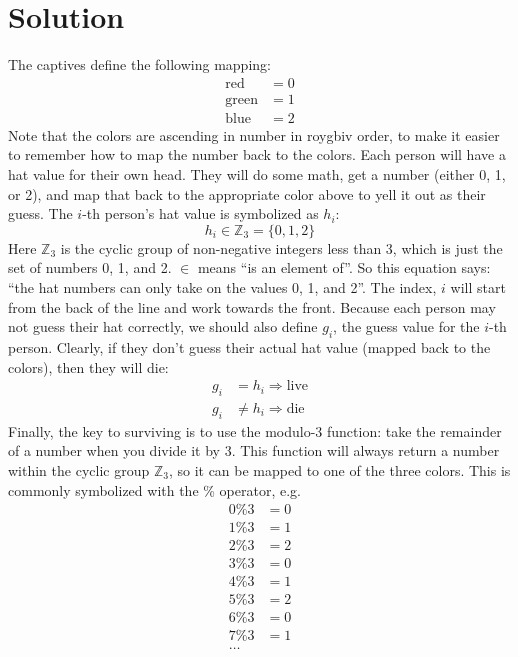 \documentclass[10pt]{article}
\begin{document}
\newpage

\section{Solution}

The captives define the following mapping:
\begin{align*}
    \text{red} &= 0 \\
    \text{green} &= 1 \\
    \text{blue} &= 2
\end{align*}
Note that the colors are ascending in number in roygbiv order, to 
make it easier to remember how to map the number back to the colors. 
Each person will have a hat value for their own head. They will 
do some math, get a number (either 0, 1, or 2), and map that back to 
the appropriate color above to yell it out as their guess. 
The $i$-th person's 
hat value is symbolized as $h_i$:
\begin{equation*}
    h_i \in \mathbb{Z}_3 = \{0,1,2\}
\end{equation*}
Here $\mathbb{Z}_3$ is the cyclic group of non-negative 
integers less than 3, which is just the set of numbers 0, 1, and 2. $\in$ 
means ``is an element of''. So this equation says: ``the hat numbers can only 
take on the values 0, 1, and 2''. The 
index, $i$ will start from the back of the line and work towards the 
front. Because each person may not guess their hat correctly, we should 
also define $g_i$, the guess value for the $i$-th person. Clearly, if they 
don't guess their actual hat value (mapped back to the colors), then they will 
die:
\begin{align*}
    g_i &= h_i \Rightarrow\text{live} \\
    g_i &\neq h_i \Rightarrow\text{die}
\end{align*}
Finally, the key to surviving is to use the modulo-3 function: take the 
remainder of a number when you divide it by 3. This function will always 
return a number within the cyclic group $\mathbb{Z}_3$, so it can be mapped 
to one of the three colors. This is commonly symbolized with the 
\% operator, e.g.
\begin{align*}
    0\%3&=0 \\
    1\%3&=1 \\
    2\%3&=2 \\
    3\%3&=0 \\
    4\%3&=1 \\
    5\%3&=2 \\
    6\%3&=0 \\
    7\%3&=1 \\
    \ldots
\end{align*}
\end{document}
